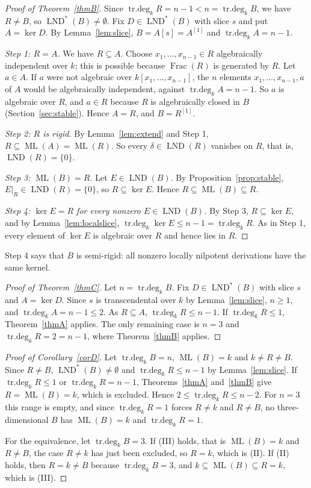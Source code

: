 \documentclass[11pt]{amsart}
\theoremstyle{definition}
\DeclareMathOperator{\ML}{ML}
\DeclareMathOperator{\LND}{LND}
\DeclareMathOperator{\Frac}{Frac}
\DeclareMathOperator{\trdeg}{tr.deg}
\newcommand{\LNDs}{\LND^{*}}
\newcommand{\td}[1]{\trdeg_k #1}
\begin{document}
\begin{proof}[Proof of Theorem~\ref{thmB}]
Since $\td{R}=n-1<n=\td{B}$, we have $R\neq B$, so $\LNDs(B)\neq\emptyset$. Fix $D\in\LNDs(B)$ with slice $s$ and put $A=\ker D$. By Lemma~\ref{lem:slice}, $B=A[s]=A^{[1]}$ and $\td{A}=n-1$.

\emph{Step 1: $R=A$.} We have $R\subseteq A$. Choose $x_1,\dots,x_{n-1}\in R$ algebraically independent over $k$; this is possible because $\Frac(R)$ is generated by $R$. Let $a\in A$. If $a$ were not algebraic over $k[x_1,\dots,x_{n-1}]$, the $n$ elements $x_1,\dots,x_{n-1},a$ of $A$ would be algebraically independent, against $\td{A}=n-1$. So $a$ is algebraic over $R$, and $a\in R$ because $R$ is algebraically closed in $B$ (Section~\ref{sec:stable}). Hence $A=R$, and $B=R^{[1]}$.

\emph{Step 2: $R$ is rigid.} By Lemma~\ref{lem:extend} and Step 1, $R\subseteq\ML(A)=\ML(R)$. So every $\delta\in\LND(R)$ vanishes on $R$, that is, $\LND(R)=\{0\}$.

\emph{Step 3: $\ML(B)=R$.} Let $E\in\LND(B)$. By Proposition~\ref{prop:stable}, $E|_R\in\LND(R)=\{0\}$, so $R\subseteq\ker E$. Hence $R\subseteq\ML(B)\subseteq R$.

\emph{Step 4: $\ker E=R$ for every nonzero $E\in\LND(B)$.} By Step 3, $R\subseteq\ker E$, and by Lemma~\ref{lem:localslice}, $\td{\ker E}\le n-1=\td R$. As in Step 1, every element of $\ker E$ is algebraic over $R$ and hence lies in $R$.
\end{proof}

Step 4 says that $B$ is semi-rigid: all nonzero locally nilpotent derivations have the same kernel.

\begin{proof}[Proof of Theorem~\ref{thmC}]
Let $n=\td{B}$. Fix $D\in\LNDs(B)$ with slice $s$ and $A=\ker D$. Since $s$ is transcendental over $k$ by Lemma~\ref{lem:slice}, $n\ge1$, and $\td{A}=n-1\le2$. As $R\subseteq A$, $\td{R}\le n-1$. If $\td{R}\le1$, Theorem~\ref{thmA} applies. The only remaining case is $n=3$ and $\td{R}=2=n-1$, where Theorem~\ref{thmB} applies.
\end{proof}

\begin{proof}[Proof of Corollary~\ref{corD}]
Let $\td{B}=n$, $\ML(B)=k$ and $k\neq R\neq B$. Since $R\neq B$, $\LNDs(B)\neq\emptyset$ and $\td{R}\le n-1$ by Lemma~\ref{lem:slice}. If $\td{R}\le1$ or $\td{R}=n-1$, Theorems~\ref{thmA} and~\ref{thmB} give $R=\ML(B)=k$, which is excluded. Hence $2\le\td{R}\le n-2$. For $n=3$ this range is empty, and since $\td{R}=1$ forces $R\neq k$ and $R\neq B$, no three-dimensional $B$ has $\ML(B)=k$ and $\td{R}=1$.

For the equivalence, let $\td{B}=3$. If (III) holds, that is $\ML(B)=k$ and $R\neq B$, the case $R\neq k$ has just been excluded, so $R=k$, which is (II). If (II) holds, then $R=k\neq B$ because $\td{B}=3$, and $k\subseteq\ML(B)\subseteq R=k$, which is (III).
\end{proof}
\end{document}

